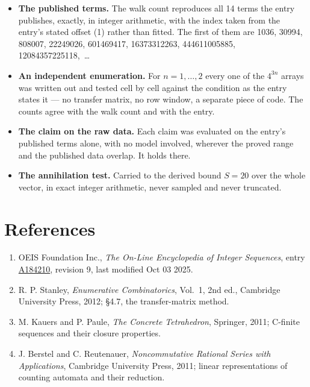 \documentclass[11pt]{article}
\theoremstyle{definition}
\begin{document}
\begin{itemize}

\item {\bfseries The published terms.} The walk count reproduces all 14 terms the entry publishes, exactly, in integer arithmetic, with the index taken from the entry's stated offset (1) rather than fitted. The first of them are 1036, 30994, 808007, 22249026, 601469417, 16373312263, 444611005885, 12084357225118,~\dots

\item {\bfseries An independent enumeration.} For $n = 1,\dots,2$ every one of the $4^{3n}$ arrays was written out and tested cell by cell against the condition as the entry states it --- no transfer matrix, no row window, a separate piece of code. The counts agree with the walk count and with the entry.

\item {\bfseries The claim on the raw data.} Each claim was evaluated on the entry's published terms alone, with no model involved, wherever the proved range and the published data overlap. It holds there.

\item {\bfseries The annihilation test.} Carried to the derived bound $S = 20$ over the whole vector, in exact integer arithmetic, never sampled and never truncated.

\end{itemize}

\section{References}

\begin{enumerate}

\item OEIS Foundation Inc., \emph{The On-Line Encyclopedia of Integer Sequences}, entry \href{https://oeis.org/A184210}{A184210}, revision 9, last modified Oct 03 2025.

\item R. P. Stanley, \emph{Enumerative Combinatorics}, Vol.~1, 2nd ed., Cambridge University Press, 2012; \S4.7, the transfer-matrix method.

\item M. Kauers and P. Paule, \emph{The Concrete Tetrahedron}, Springer, 2011; C-finite sequences and their closure properties.

\item J. Berstel and C. Reutenauer, \emph{Noncommutative Rational Series with Applications}, Cambridge University Press, 2011; linear representations of counting automata and their reduction.

\end{enumerate}
\end{document}
